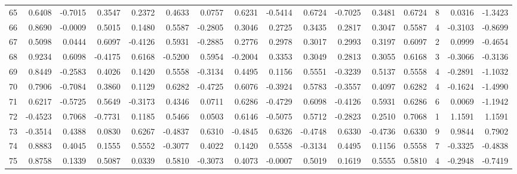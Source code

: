 \begin{tabular}{lrrrrrrrrrrrrrrr}
65  &      0.6408 & -0.7015 &  0.3547 &  0.2372 &  0.4633 &  0.0757 &  0.6231 & -0.5414 &  0.6724 & -0.7025 &   0.3481 &     0.6724 &      8 &                    0.0316 &                    -1.3423 \\
66  &      0.8690 & -0.0009 &  0.5015 &  0.1480 &  0.5587 & -0.2805 &  0.3046 &  0.2725 &  0.3435 &  0.2817 &   0.3047 &     0.5587 &      4 &                   -0.3103 &                    -0.8699 \\
67  &      0.5098 &  0.0444 &  0.6097 & -0.4126 &  0.5931 & -0.2885 &  0.2776 &  0.2978 &  0.3017 &  0.2993 &   0.3197 &     0.6097 &      2 &                    0.0999 &                    -0.4654 \\
68  &      0.9234 &  0.6098 & -0.4175 &  0.6168 & -0.5200 &  0.5954 & -0.2004 &  0.3353 &  0.3049 &  0.2813 &   0.3055 &     0.6168 &      3 &                   -0.3066 &                    -0.3136 \\
69  &      0.8449 & -0.2583 &  0.4026 &  0.1420 &  0.5558 & -0.3134 &  0.4495 &  0.1156 &  0.5551 & -0.3239 &   0.5137 &     0.5558 &      4 &                   -0.2891 &                    -1.1032 \\
70  &      0.7906 & -0.7084 &  0.3860 &  0.1129 &  0.6282 & -0.4725 &  0.6076 & -0.3924 &  0.5783 & -0.3557 &   0.4097 &     0.6282 &      4 &                   -0.1624 &                    -1.4990 \\
71  &      0.6217 & -0.5725 &  0.5649 & -0.3173 &  0.4346 &  0.0711 &  0.6286 & -0.4729 &  0.6098 & -0.4126 &   0.5931 &     0.6286 &      6 &                    0.0069 &                    -1.1942 \\
72  &     -0.4523 &  0.7068 & -0.7731 &  0.1185 &  0.5466 &  0.0503 &  0.6146 & -0.5075 &  0.5712 & -0.2823 &   0.2510 &     0.7068 &      1 &                    1.1591 &                     1.1591 \\
73  &     -0.3514 &  0.4388 &  0.0830 &  0.6267 & -0.4837 &  0.6310 & -0.4845 &  0.6326 & -0.4748 &  0.6330 &  -0.4736 &     0.6330 &      9 &                    0.9844 &                     0.7902 \\
74  &      0.8883 &  0.4045 &  0.1555 &  0.5552 & -0.3077 &  0.4022 &  0.1420 &  0.5558 & -0.3134 &  0.4495 &   0.1156 &     0.5558 &      7 &                   -0.3325 &                    -0.4838 \\
75  &      0.8758 &  0.1339 &  0.5087 &  0.0339 &  0.5810 & -0.3073 &  0.4073 & -0.0007 &  0.5019 &  0.1619 &   0.5555 &     0.5810 &      4 &                   -0.2948 &                    -0.7419 \\

\end{tabular}
